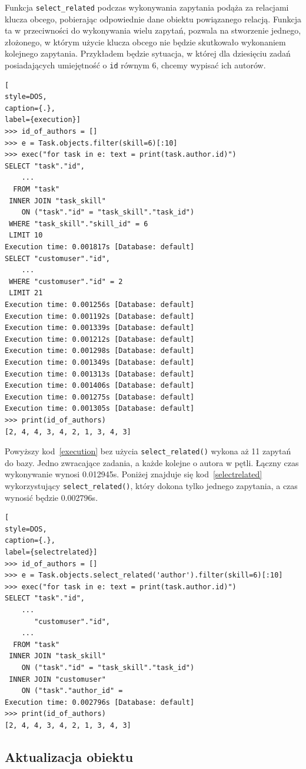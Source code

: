 \documentclass[oneside,polski,logo,indent]{amuthesis}
\begin{document}
Funkcja \texttt{select\_related} podczas wykonywania zapytania podąża za relacjami klucza obcego, pobierając odpowiednie dane obiektu powiązanego relacją.
Funkcja ta w przeciwności do wykonywania wielu zapytań, pozwala na stworzenie jednego, złożonego, w którym użycie klucza obcego nie będzie skutkowało wykonaniem kolejnego zapytania. Przykładem będzie sytuacja, w której dla dziesięciu zadań posiadających umiejętność o \texttt{id} równym 6, chcemy wypisać ich autorów.
\begin{lstlisting}[
style=DOS,
caption={.},
label={execution}]
>>> id_of_authors = []
>>> e = Task.objects.filter(skill=6)[:10]
>>> exec("for task in e: text = print(task.author.id)")
SELECT "task"."id",
	...
  FROM "task"
 INNER JOIN "task_skill"
    ON ("task"."id" = "task_skill"."task_id")
 WHERE "task_skill"."skill_id" = 6
 LIMIT 10
Execution time: 0.001817s [Database: default]
SELECT "customuser"."id",
	...
 WHERE "customuser"."id" = 2
 LIMIT 21
Execution time: 0.001256s [Database: default]
Execution time: 0.001192s [Database: default]
Execution time: 0.001339s [Database: default]
Execution time: 0.001212s [Database: default]
Execution time: 0.001298s [Database: default]
Execution time: 0.001349s [Database: default]
Execution time: 0.001313s [Database: default]
Execution time: 0.001406s [Database: default]
Execution time: 0.001275s [Database: default]
Execution time: 0.001305s [Database: default]
>>> print(id_of_authors)
[2, 4, 4, 3, 4, 2, 1, 3, 4, 3]
\end{lstlisting}
Powyższy kod~\ref{execution} bez użycia \texttt{select\_related()} wykona aż 11 zapytań do bazy. Jedno zwracające zadania, a każde kolejne o autora w pętli. Łączny czas wykonywanie wynosi 0.012945s. Poniżej znajduje się kod~\ref{selectrelated} wykorzystujący \texttt{select\_related()}, który dokona tylko jednego zapytania, a czas wynosić będzie 0.002796s.
\begin{lstlisting}[
style=DOS,
caption={.},
label={selectrelated}]
>>> id_of_authors = []
>>> e = Task.objects.select_related('author').filter(skill=6)[:10]
>>> exec("for task in e: text = print(task.author.id)")
SELECT "task"."id",
	...
       "customuser"."id",
	...
  FROM "task"
 INNER JOIN "task_skill"
    ON ("task"."id" = "task_skill"."task_id")
 INNER JOIN "customuser"
    ON ("task"."author_id" =
Execution time: 0.002796s [Database: default]
>>> print(id_of_authors)
[2, 4, 4, 3, 4, 2, 1, 3, 4, 3]
\end{lstlisting}

\begin{center}
\subsection{Aktualizacja obiektu}
\end{center}
\end{document}
